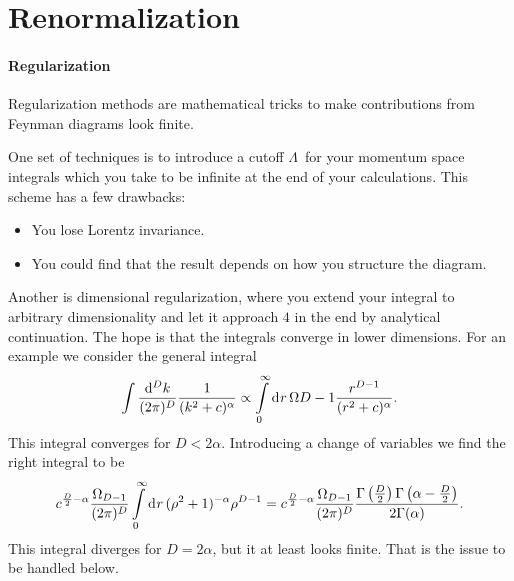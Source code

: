 \section{Renormalization}

\paragraph{Regularization}
Regularization methods are mathematical tricks to make contributions from Feynman diagrams look finite.

One set of techniques is to introduce a cutoff $\Lambda$ for your momentum space integrals which you take to be infinite at the end of your calculations. This scheme has a few drawbacks:
\begin{itemize}
	\item You lose Lorentz invariance.
	\item You could find that the result depends on how you structure the diagram.
\end{itemize}

Another is dimensional regularization, where you extend your integral to arbitrary dimensionality and let it approach $4$ in the end by analytical continuation. The hope is that the integrals converge in lower dimensions. For an example we consider the general integral
\begin{align*}
	\int\limits_{}^{}\frac{\dd[D]{k}}{(2\pi)^{D}}\frac{1}{(k^{2} + c)^{\alpha}} \propto \int\limits_{0}^{\infty}\dd[]{r}\Omega{D - 1}\frac{r^{D - 1}}{(r^{2} + c)^{\alpha}}.
\end{align*}
This integral converges for $D < 2\alpha$. Introducing a change of variables we find the right integral to be
\begin{align*}
	c^{\frac{D}{2} - \alpha}\frac{\Omega_{D - 1}}{(2\pi)^{D}}\int\limits_{0}^{\infty}\dd[]{r}(\rho^{2} + 1)^{-\alpha}\rho^{D - 1} = c^{\frac{D}{2} - \alpha}\frac{\Omega_{D - 1}}{(2\pi)^{D}}\frac{\Gamma\left(\frac{D}{2}\right)\Gamma\left(\alpha - \frac{D}{2}\right)}{2\Gamma(\alpha)}.
\end{align*}
This integral diverges for $D = 2\alpha$, but it at least looks finite. That is the issue to be handled below.

